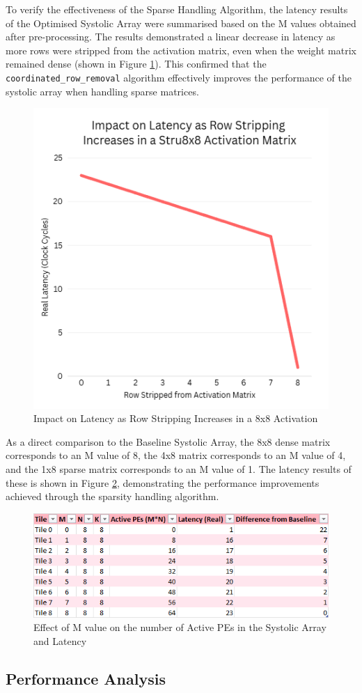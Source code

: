 \documentclass[12pt, a4paper, ukenglish]{article}
\newcommand{\optimisedMValueFigure}{
    \begin{figure}[ht]
        \centering
        \includegraphics[width=0.5\linewidth]{results/Effect of M value on the number of Active PEs in the Systolic Array and Latency v2.png}
        \caption{Effect of M value on the number of Active PEs in the Systolic Array and Latency}
        \label{fig:optimised_m_value}
    \end{figure}
}
\newcommand{\optimisedLatencyRowStrippingGraph}{
    \begin{figure}[ht]
        \centering
        \includegraphics[width=0.4\linewidth]{results/Impact on Latency as Row Stripping Increases in a 8x8 Activation Graph.png}
        \caption{Impact on Latency as Row Stripping Increases in a 8x8 Activation}
        \label{fig:latency_row_stripping_graph}
    \end{figure}
}
\begin{document}
    To verify the effectiveness of the Sparse Handling Algorithm, the latency results of the Optimised Systolic Array were summarised based on the M values obtained after pre-processing. The results demonstrated a linear decrease in latency as more rows were stripped from the activation matrix, even when the weight matrix remained dense (shown in Figure \ref{fig:latency_row_stripping_graph}). This confirmed that the \texttt{coordinated\_row\_removal} algorithm effectively improves the performance of the systolic array when handling sparse matrices.  
    \optimisedLatencyRowStrippingGraph

    As a direct comparison to the Baseline Systolic Array, the 8x8 dense matrix corresponds to an M value of 8, the 4x8 matrix corresponds to an M value of 4, and the 1x8 sparse matrix corresponds to an M value of 1. The latency results of these is shown in Figure \ref{fig:optimised_m_value}, demonstrating the performance improvements achieved through the sparsity handling algorithm.
    \optimisedMValueFigure

    



    \subsection{Performance Analysis}\label{sec: per analysis}
    
\end{document}
